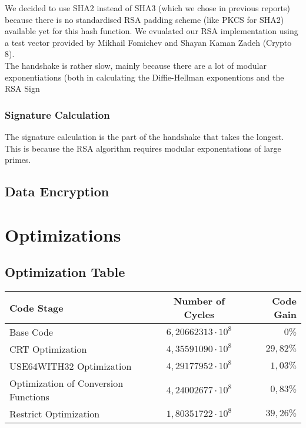 \documentclass[a4paper]{article}
\begin{document}
We decided to use SHA2 instead of SHA3 (which we chose in previous reports) because there is no standardised RSA padding scheme (like PKCS for SHA2) available yet for this hash function. We evualated our RSA implementation using a test vector provided by Mikhail Fomichev and Shayan Kaman Zadeh (Crypto 8).\\

The handshake is rather slow, mainly because there are a lot of modular exponentiations (both in calculating the Diffie-Hellman exponentions and the RSA Sign

\subsubsection{Signature Calculation}

The signature calculation is the part of the handshake that takes the longest. This is because the RSA algorithm requires modular exponentations of large primes. 

\subsection{Data Encryption}

\section{Optimizations}

\subsection{Optimization Table}

\begin{center}
	\begin{tabular}{| l | c | r |}
		\hline
		Code Stage & Number of Cycles & Code Gain \\ \hline
		Base Code & $6,20662313 \cdot 10^{8}$ 	& $0\%$ \\
		CRT Optimization & $4,35591090 \cdot 10^{8}$ & $29,82\%$ \\
		USE64WITH32 Optimization 	& $4,29177952 \cdot 10^{8}$ & $1,03\%$ \\
		Optimization of Conversion Functions & $4,24002677 \cdot 10^{8}$ & $0,83\%$ \\
		Restrict Optimization	 & $1,80351722 \cdot 10^{8}$ & $39,26\%$ \\
		\hline
	\end{tabular}
\end{center}
\end{document}
